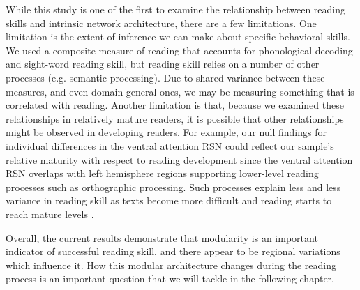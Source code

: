 While this study is one of the first to examine the relationship between reading skills and intrinsic network architecture, there are a few limitations. One limitation is the extent of inference we can make about specific behavioral skills. We used a composite measure of reading that accounts for phonological decoding and sight-word reading skill, but reading skill relies on a number of other processes (e.g. semantic processing). Due to shared variance between these measures, and even domain-general ones, we may be measuring something that is correlated with reading. Another limitation is that, because we examined these relationships in relatively mature readers, it is possible that other relationships might be observed in developing readers. For example, our null findings for individual differences in the ventral attention RSN could reflect our sample's relative maturity with respect to reading development since the ventral attention RSN overlaps with left hemisphere regions supporting lower-level reading processes such as orthographic processing. Such processes explain less and less variance in reading skill as texts become more difficult and reading starts to reach mature levels \citep{Cutting2006}. 

Overall, the current results demonstrate that modularity is an important indicator of successful reading skill, and there appear to be regional variations which influence it. How this modular architecture changes during the reading process is an important question that we will tackle in the following chapter.

